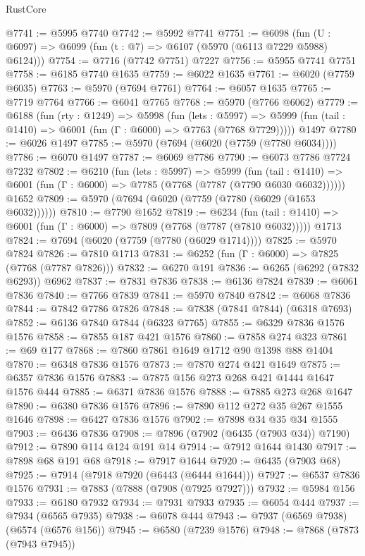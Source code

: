 \begin{lexlean}{RustCore}
\begin{coremodule}
{\begin{coremodule}
{{{{{{{{{{{{{{{{{{{{{{{{{{{{{{{{{{{{{{{{{{{{{@7741 := @5995 @7740
@7742 := @5992 @7741
@7751 := @6098 (fun (U : @6097) => @6099 (fun (t : @7) => @6107 (@5970 (@6113 @7229 @5988) @6124)))
@7754 := @7716 (@7742 @7751) @7227
@7756 := @5955 @7741 @7751
@7758 := @6185 @7740 @1635
@7759 := @6022 @1635
@7761 := @6020 (@7759 @6035)
@7763 := @5970 (@7694 @7761)
@7764 := @6057 @1635
@7765 := @7719 @7764
@7766 := @6041 @7765
@7768 := @5970 (@7766 @6062)
@7779 := @6188
    (fun (rty : @1249) =>
    @5998
      (fun (lets : @5997) =>
      @5999 (fun (tail : @1410) => @6001 (fun (Γ : @6000) => @7763 (@7768 @7729)))))
    @1497
@7780 := @6026 @1497
@7785 := @5970 (@7694 (@6020 (@7759 (@7780 @6034))))
@7786 := @6070 @1497
@7787 := @6069 @7786
@7790 := @6073 @7786 @7724 @7232
@7802 := @6210
    (fun (lets : @5997) =>
    @5999
      (fun (tail : @1410) => @6001 (fun (Γ : @6000) => @7785 (@7768 (@7787 (@7790 @6030 @6032))))))
    @1652
@7809 := @5970 (@7694 (@6020 (@7759 (@7780 (@6029 (@1653 @6032))))))
@7810 := @7790 @1652
@7819 := @6234
    (fun (tail : @1410) => @6001 (fun (Γ : @6000) => @7809 (@7768 (@7787 (@7810 @6032)))))
    @1713
@7824 := @7694 (@6020 (@7759 (@7780 (@6029 @1714))))
@7825 := @5970 @7824
@7826 := @7810 @1713
@7831 := @6252 (fun (Γ : @6000) => @7825 (@7768 (@7787 @7826)))
@7832 := @6270 @191
@7836 := @6265 (@6292 (@7832 @6293)) @6962
@7837 := @7831 @7836
@7838 := @6136 @7824
@7839 := @6061 @7836
@7840 := @7766 @7839
@7841 := @5970 @7840
@7842 := @6068 @7836
@7844 := @7842 @7786 @7826
@7848 := @7838 (@7841 @7844) (@6318 @7693)
@7852 := @6136 @7840 @7844 (@6323 @7765)
@7855 := @6329 @7836 @1576 @1576
@7858 := @7855 @187 @421 @1576
@7860 := @7858 @274 @323
@7861 := @69 @177
@7868 := @7860 @7861 @1649 @1712 @90 @1398 @88 @1404
@7870 := @6348 @7836 @1576
@7873 := @7870 @274 @421 @1649
@7875 := @6357 @7836 @1576
@7883 := @7875 @156 @273 @268 @421 @1444 @1647 @1576 @444
@7885 := @6371 @7836 @1576
@7888 := @7885 @273 @268 @1647
@7890 := @6380 @7836 @1576
@7896 := @7890 @112 @272 @35 @267 @1555 @1646
@7898 := @6427 @7836 @1576
@7902 := @7898 @34 @35 @34 @1555
@7903 := @6436 @7836
@7908 := @7896 (@7902 (@6435 (@7903 @34)) @7190)
@7912 := @7890 @114 @124 @191 @14
@7914 := @7912 @1644 @1430
@7917 := @7898 @68 @191 @68
@7918 := @7917 @1644
@7920 := @6435 (@7903 @68)
@7925 := @7914 (@7918 @7920 (@6443 (@6444 @1644)))
@7927 := @6537 @7836 @1576
@7931 := @7883 (@7888 (@7908 (@7925 @7927)))
@7932 := @5984 @156
@7933 := @6180 @7932
@7934 := @7931 @7933
@7935 := @6054 @444
@7937 := @7934 (@6565 @7935)
@7938 := @6078 @444
@7943 := @7937 (@6569 @7938) (@6574 (@6576 @156))
@7945 := @6580 (@7239 @1576)
@7948 := @7868 (@7873 (@7943 @7945))
}}}}}}}}}}}}}}}}}}}}}}}}}}}}}}}}}}}}}}}}}}}}}
\end{coremodule}}
\end{coremodule}
\end{lexlean}
